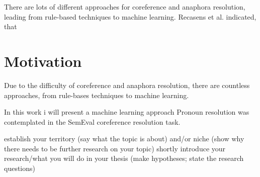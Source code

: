 There are lots of different approaches for coreference and anaphora resolution, leading from rule-based techniques to machine learning. Recasens et al. indicated, that 

\section{Motivation}


Due to the difficulty of coreference and anaphora resolution, there are countless approaches, from rule-bases techniques to machine learning. 

In this work i will present a machine learning approach 
Pronoun resolution was contemplated in the SemEval coreference resolution task. 




establish your territory (say what the topic is about) and/or niche (show why there needs to be further research on your topic)
shortly introduce your research/what you will do in your thesis (make hypotheses; state the research questions)



